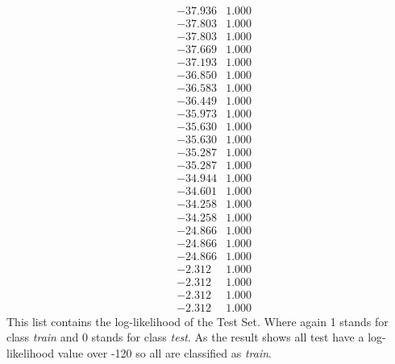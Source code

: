 \documentclass[conference]{IEEEtran}
\begin{document}
$$\begin{smallmatrix}
 &-37.936 &1.000\\
 &-37.803 &1.000\\
 &-37.803 &1.000\\
 &-37.669 &1.000\\
 &-37.193 &1.000\\
 &-36.850 &1.000\\
 &-36.583 &1.000\\
 &-36.449 &1.000\\
 &-35.973 &1.000\\
 &-35.630 &1.000\\
 &-35.630 &1.000\\
 &-35.287 &1.000\\
 &-35.287 &1.000\\
 &-34.944 &1.000\\
 &-34.601 &1.000\\
 &-34.258 &1.000\\
 &-34.258 &1.000\\
 &-24.866 &1.000\\
 &-24.866 &1.000\\
 &-24.866 &1.000\\
 &-2.312 &1.000\\
 &-2.312 &1.000\\
 &-2.312 &1.000\\
 &-2.312 &1.000
 \end{smallmatrix}
$$
\newpage
This list contains the log-likelihood of the Test Set. Where again 1 stands for class \textit{train} and 0 stands for class \textit{test}. As the result shows all test have a log-likelihood value over -120 so all are classified as \textit{train}.
\end{document}
